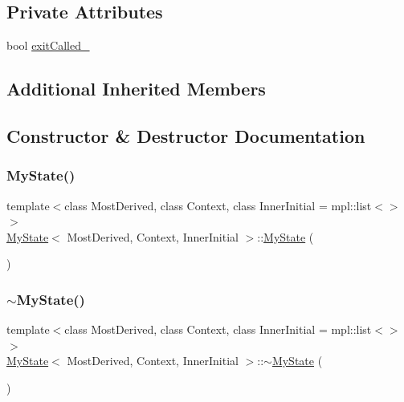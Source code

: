 \subsection*{Private Attributes}
\begin{DoxyCompactItemize}
\item 
bool \mbox{\hyperlink{struct_my_state_a4557684945dea52568cb29e61410c88a}{exit\+Called\+\_\+}}
\end{DoxyCompactItemize}
\subsection*{Additional Inherited Members}


\subsection{Constructor \& Destructor Documentation}
\mbox{\label{struct_my_state_a0726bf23499177701cd81d59dde63264}} 
\subsubsection{\texorpdfstring{My\+State()}{MyState()}}
{\footnotesize\ttfamily template$<$class Most\+Derived, class Context, class Inner\+Initial = mpl\+::list$<$$>$$>$ \\
\mbox{\hyperlink{struct_my_state}{My\+State}}$<$ Most\+Derived, Context, Inner\+Initial $>$\+::\mbox{\hyperlink{struct_my_state}{My\+State}} (\begin{DoxyParamCaption}{ }\end{DoxyParamCaption})\hspace{0.3cm}{\ttfamily [inline]}}

\mbox{\label{struct_my_state_a64bb530d3de2fcd5dd4ee1c11d9886e5}} 
\subsubsection{\texorpdfstring{$\sim$\+My\+State()}{~MyState()}}
{\footnotesize\ttfamily template$<$class Most\+Derived, class Context, class Inner\+Initial = mpl\+::list$<$$>$$>$ \\
\mbox{\hyperlink{struct_my_state}{My\+State}}$<$ Most\+Derived, Context, Inner\+Initial $>$\+::$\sim$\mbox{\hyperlink{struct_my_state}{My\+State}} (\begin{DoxyParamCaption}{ }\end{DoxyParamCaption})\hspace{0.3cm}{\ttfamily [inline]}}



